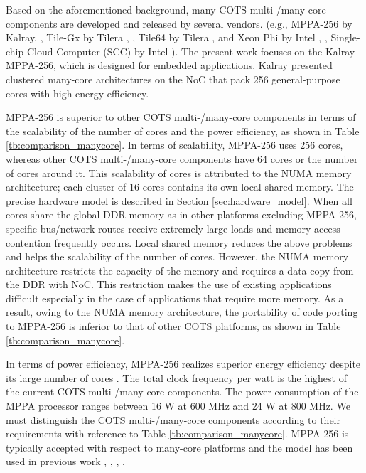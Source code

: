 Based on the aforementioned background, many COTS multi-/many-core components are developed and released by several vendors.
(e.g., MPPA-256 by Kalray, \cite{de2014time}, Tile-Gx by Tilera \cite{ramey2011tile}, \cite{schooler2010tile}, Tile64 by Tilera \cite{bell2008tile64}, and Xeon Phi by Intel \cite{chrysos2014intel}, \cite{chrysos2012intel}, Single-chip Cloud Computer (SCC) by Intel \cite{baron2010single}).
The present work focuses on the Kalray MPPA-256, which is designed for embedded applications.
Kalray \cite{de2014time} presented clustered many-core architectures on the NoC that pack 256 general-purpose cores with high energy efficiency.


MPPA-256 is superior to other COTS multi-/many-core components in terms of the scalability of the number of cores and the power efficiency, as shown in Table \ref{tb:comparison_manycore}.
In terms of scalability, MPPA-256 uses 256 cores, whereas other COTS multi-/many-core components have 64 cores or the number of cores around it.
This scalability of cores is attributed to the NUMA memory architecture; each cluster of 16 cores contains its own local shared memory.
The precise hardware model is described in Section \ref{sec:hardware_model}.
When all cores share the global DDR memory as in other platforms excluding MPPA-256, specific bus/network routes receive extremely large loads and memory access contention frequently occurs.
Local shared memory reduces the above problems and helps the scalability of the number of cores.
However, the NUMA memory architecture restricts the capacity of the memory and requires a data copy from the DDR with NoC.
This restriction makes the use of existing applications difficult especially in the case of applications that require more memory.
As a result, owing to the NUMA memory architecture, the portability of code porting to MPPA-256 is inferior to that of other COTS platforms, as shown in Table \ref{tb:comparison_manycore}.

In terms of power efficiency, MPPA-256 realizes superior energy efficiency despite its large number of cores \cite{kanter2015kalray}.
The total clock frequency per watt is the highest of the current COTS multi-/many-core components.
The power consumption of the MPPA processor ranges between 16 W at 600 MHz and 24 W at 800 MHz.
We must distinguish the COTS multi-/many-core components according to their requirements with reference to Table \ref{tb:comparison_manycore}.
MPPA-256 is typically accepted with respect to many-core platforms and the model has been used in previous work \cite{becker2016contention}, \cite{carle2014static}, \cite{perret2016mapping}, \cite{perret2016predictable}.


